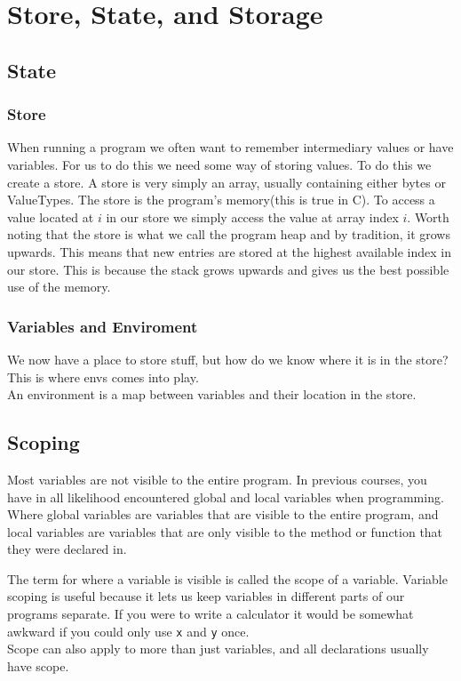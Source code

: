 \chapter{Store, State, and Storage}

\section{State}
\label{sec:state}
\subsection{Store}
\label{subsec:store}
When running a program we often want to remember intermediary values or have variables. For us to do this we need some way of storing values.
To do this we create a \gls{store}. A store is very simply an array, usually containing either bytes or ValueTypes. 
The store is the program's memory(this is true in C). To access a value located at $i$ in our store we simply access the value at array index $i$.
Worth noting that the store is what we call the program heap and by tradition, it grows upwards. This means that new entries are stored at the highest available index in our store.
This is because the stack grows upwards and gives us the best possible use of the memory.

\subsection{Variables and Enviroment}
\label{subsec:vars}
We now have a place to store stuff, but how do we know where it is in the store? This is where \glspl{env} comes into play.\\
An environment is a map between variables and their location in the store. \\
\section{Scoping}
\label{sec:scope}

Most variables are not visible to the entire program.
In previous courses, you have in all likelihood encountered global and local variables when programming.
Where global variables are variables that are visible to the entire program, and local variables are variables that are only visible to the method or function that they were declared in.

The term for where a variable is visible is called the \gls{scope} of a variable.
Variable scoping is useful because it lets us keep variables in different parts of our programs separate.
If you were to write a calculator it would be somewhat awkward if you could only use \texttt{x} and \texttt{y} once.\\
\newline
Scope can also apply to more than just variables, and all declarations usually have scope.


